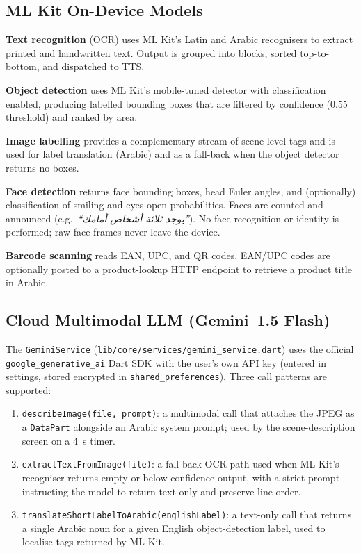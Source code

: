 \documentclass[11pt,a4paper]{article}
\begin{document}
\subsection{ML Kit On-Device Models}

\textbf{Text recognition} (OCR) uses ML Kit's Latin and Arabic
recognisers to extract printed and handwritten text. Output is grouped
into blocks, sorted top-to-bottom, and dispatched to TTS.

\textbf{Object detection} uses ML Kit's mobile-tuned detector with
classification enabled, producing labelled bounding boxes that are
filtered by confidence (0.55 threshold) and ranked by area.

\textbf{Image labelling} provides a complementary stream of scene-level
tags and is used for label translation (Arabic) and as a fall-back when
the object detector returns no boxes.

\textbf{Face detection} returns face bounding boxes, head Euler angles,
and (optionally) classification of smiling and eyes-open probabilities.
Faces are counted and announced (e.g.\ \emph{``يوجد ثلاثة أشخاص أمامك''}).
No face-recognition or identity is performed; raw face frames never
leave the device.

\textbf{Barcode scanning} reads EAN, UPC, and QR codes. EAN/UPC codes are
optionally posted to a product-lookup HTTP endpoint to retrieve a product
title in Arabic.

\subsection{Cloud Multimodal LLM (Gemini~1.5 Flash)}

The \texttt{GeminiService} (\texttt{lib/core/services/gemini\_service.dart})
uses the official \texttt{google\_generative\_ai} Dart SDK with the user's
own API key (entered in settings, stored encrypted in
\texttt{shared\_preferences}). Three call patterns are supported:

\begin{enumerate}
\item \texttt{describeImage(file, prompt)}: a multimodal call that
attaches the JPEG as a \texttt{DataPart} alongside an Arabic system
prompt; used by the scene-description screen on a 4~s timer.
\item \texttt{extractTextFromImage(file)}: a fall-back OCR path used when
ML Kit's recogniser returns empty or below-confidence output, with a
strict prompt instructing the model to return text only and preserve
line order.
\item \texttt{translateShortLabelToArabic(englishLabel)}: a text-only
call that returns a single Arabic noun for a given English
object-detection label, used to localise tags returned by ML Kit.
\end{enumerate}
\end{document}
